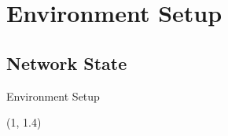 \documentclass[english,aspectratio=169,dvipsnames]{beamer}
\begin{document}
\section{Environment Setup}


\subsection{Network State}

\begin{frame}{Environment Setup}{}
	\begin{textblock}{5}(1, 1.4)
        
    \end{textblock}
\end{frame}


%         




	



	


\end{document}
